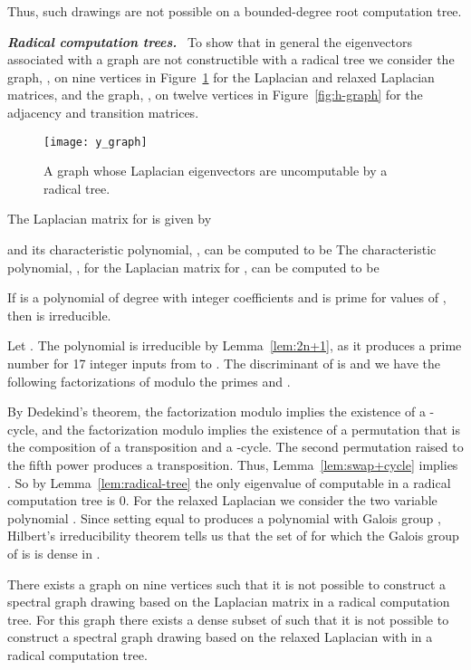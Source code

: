 \documentclass[oribibl,10pt]{llncs}
\newcommand{\Emph}[1]{\smallskip\textbf{\textit{#1}}~}
\begin{document}
Thus, such drawings are not possible on a bounded-degree root computation tree.

\Emph{Radical computation trees.} To show that in general the eigenvectors associated with a graph are not constructible with a radical tree we consider the graph, , on nine vertices in Figure~\ref{fig:y-graph} for the Laplacian and relaxed Laplacian matrices, and the graph, , on twelve vertices in Figure~\ref{fig:h-graph} for the adjacency and transition matrices.

\begin{figure}[htb]
\vspace*{-12pt}
\centering
\texttt{[image: y\_graph]}
\caption{A graph  whose Laplacian eigenvectors are uncomputable by a radical tree.}
\label{fig:y-graph}
\end{figure}

\ifFull
The Laplacian matrix for  is given by

and its characteristic polynomial, ,
can be computed to be
\else
The characteristic polynomial, ,
for the Laplacian matrix for ,
can be computed to be
\fi


\begin{lemma}\label{lem:2n+1}
If  is a polynomial of degree  with integer coefficients and  is prime for  values of , then  is irreducible.
\end{lemma}

Let . The polynomial  is irreducible by Lemma~\ref{lem:2n+1}, as it produces a prime number for 17 integer inputs from  to . The discriminant of  is  and we have the following factorizations of  modulo the primes  and .

By Dedekind's theorem, the factorization modulo  implies the existence of a -cycle, and the factorization modulo  implies the existence of a permutation that is the composition of a transposition and a -cycle. The second permutation raised to the fifth power produces a transposition. Thus, Lemma~\ref{lem:swap+cycle} implies . So by Lemma~\ref{lem:radical-tree} the only eigenvalue of  computable in a radical computation tree is 0.
For the relaxed Laplacian we consider the two variable polynomial . Since setting  equal to  produces a polynomial with Galois group , Hilbert's irreducibility theorem tells us that the set of  for which the Galois group of  is  is dense in .

\begin{theorem}
There exists a graph on nine vertices such that it is not possible to construct a spectral graph drawing based on the Laplacian matrix in a radical computation tree. For this graph there exists a dense subset  of  such that it is not possible to construct a spectral graph drawing based on the relaxed Laplacian with  in a radical computation tree.
\end{theorem}
\end{document}
